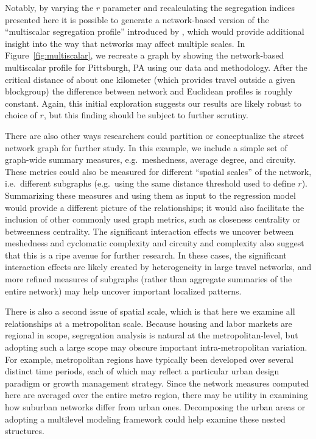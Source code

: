 \documentclass[
  10pt,
]{article}
\begin{document}
Notably, by varying the \(r\) parameter and recalculating the
segregation indices presented here it is possible to generate a
network-based version of the ``multiscalar segregation profile''
introduced by \citet{reardon2008GeographicScale}, which would provide
additional insight into the way that networks may affect multiple
scales. In Figure~\ref{fig:multiscalar}, we recreate a graph by
\citet{roberto2018SpatialProximity} showing the network-based
multiscalar profile for Pittsburgh, PA using our data and methodology.
After the critical distance of about one kilometer (which provides
travel outside a given blockgroup) the difference between network and
Euclidean profiles is roughly constant. Again, this initial exploration
suggests our results are likely robust to choice of \(r\), but this
finding should be subject to further scrutiny.

There are also other ways researchers could partition or conceptualize
the street network graph for further study. In this example, we include
a simple set of graph-wide summary measures, e.g.~meshedness, average
degree, and circuity. These metrics could also be measured for different
``spatial scales'' of the network, i.e.~different subgraphs (e.g.~using
the same distance threshold used to define \(r\)). Summarizing these
measures and using them as input to the regression model would provide a
different picture of the relationships; it would also facilitate the
inclusion of other commonly used graph metrics, such as closeness
centrality or betweenness centrality. The significant interaction
effects we uncover between meshedness and cyclomatic complexity and
circuity and complexity also suggest that this is a ripe avenue for
further research. In these cases, the significant interaction effects
are likely created by heterogeneity in large travel networks, and more
refined measures of subgraphs (rather than aggregate summaries of the
entire network) may help uncover important localized patterns.

There is also a second issue of spatial scale, which is that here we
examine all relationships at a metropolitan scale. Because housing and
labor markets are regional in scope, segregation analysis is natural at
the metropolitan-level, but adopting such a large scope may obscure
important intra-metropolitan variation. For example, metropolitan
regions have typically been developed over several distinct time
periods, each of which may reflect a particular urban design paradigm or
growth management strategy. Since the network measures computed here are
averaged over the entire metro region, there may be utility in examining
how suburban networks differ from urban ones. Decomposing the urban
areas or adopting a multilevel modeling framework could help examine
these nested structures.
\end{document}
